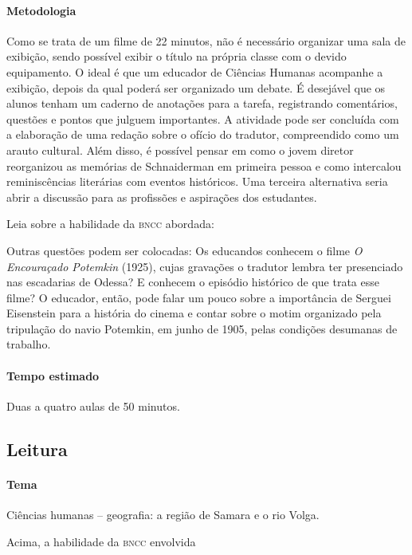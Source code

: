 \documentclass[11pt]{extarticle}
\begin{document}
\paragraph{Metodologia}
Como se trata de um filme de 22 minutos, não é necessário organizar uma
sala de exibição, sendo possível exibir o título na própria classe com o devido equipamento. O ideal é que um educador de Ciências Humanas acompanhe a exibição,
depois da qual poderá ser organizado um debate. É desejável que os
alunos tenham um caderno de anotações para a tarefa, registrando
comentários, questões e pontos que julguem importantes. A atividade pode
ser concluída com a elaboração de uma redação sobre o ofício do
tradutor, compreendido como um arauto cultural. Além disso, é possível
pensar em como o jovem diretor reorganizou as memórias de Schnaiderman
em primeira pessoa e como intercalou reminiscências literárias com
eventos históricos. Uma terceira alternativa seria abrir a discussão
para as profissões e aspirações dos estudantes.

Leia sobre a habilidade da \textsc{bncc} abordada:


Outras questões podem ser colocadas: Os educandos conhecem o filme
\emph{O Encouraçado Potemkin} (1925), cujas gravações o tradutor lembra
ter presenciado nas escadarias de Odessa? E conhecem o episódio
histórico de que trata esse filme? O educador, então, pode falar um
pouco sobre a importância de Serguei Eisenstein para a história do
cinema e contar sobre o motim organizado pela tripulação do navio
Potemkin, em junho de 1905, pelas condições desumanas de trabalho.

\paragraph{Tempo estimado} Duas a quatro aulas de 50 minutos.


\subsection{Leitura}

\paragraph{Tema} Ciências humanas -- geografia: a região de Samara e o rio Volga.


Acima, a habilidade da \textsc{bncc} envolvida
\end{document}
